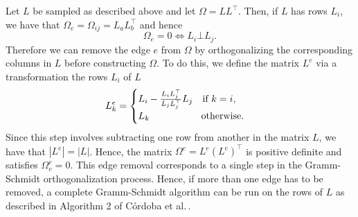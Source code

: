 Let $L$ be sampled as described above and let $\Omega = L L^\top$. Then, if $L$ has rows $L_i$, we have that $\Omega_e = \Omega_{ij} = L_a L_b^\top$ and hence
\begin{equation*}
    \Omega_e = 0 \Leftrightarrow L_i \bot L_j.
\end{equation*}
Therefore we can remove the edge $e$ from $\Omega$ by orthogonalizing the corresponding columns in $L$ before constructing $\Omega$. To do this, we define the matrix $L^e$ via a transformation the rows $L_i$ of $L$
\begin{equation*}
    L^e_k = \begin{cases}
        L_i - \frac{L_i L_j^\top}{L_j L_j^\top} L_j \ \ {\textrm{ if }} k = i,\\
        L_k \ \ \ \ \ \ \ \ \ \ \ \ \ \ \ {\textrm{ otherwise}}.
    \end{cases}
\end{equation*}
Since this step involves subtracting one row from another in the matrix $L$, we have that $|L^e| = |L|$. Hence, the matrix $\Omega^e = L^e (L^e)^\top$ is positive definite and satisfies $\Omega^e_e = 0$. This edge removal corresponds to a single step in the Gramm-Schmidt orthogonalization process. Hence, if more than one edge has to be removed, a complete Gramm-Schmidt algorithm can be run on the rows of $L$ as described in Algorithm 2 of C\'ordoba et al.\,\cite{cordoba2020generating}.